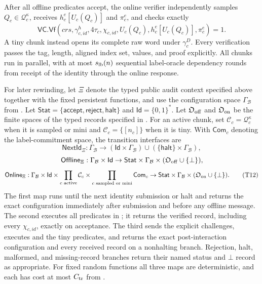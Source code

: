 \documentclass[11pt]{article}
\begin{document}
After all offline predicates accept, the online verifier independently samples
$Q_c\in\mathcal Q_c^\kappa$, receives $h^e_c[U_c(Q_c)]$ and $\pi^e_c$, and
checks exactly
\[
 \mathsf{VC.Vf}(\mathit{crs},\gamma^h_{c,\mathit{id}},4\tau_c,
 \chi_{c,\mathit{id}},U_c(Q_c),h^e_c[U_c(Q_c)],\pi^e_c)=1.
\tag{T11}\label{eq:online-opening}
\]
A tiny chunk instead opens its complete raw word under $\gamma^D_c$.  Every
verification passes the tag, length, aligned index set, values, and proof
explicitly.  All chunks run in parallel, with at most $s_{\rm lb}(n)$
sequential label-oracle dependency rounds from receipt of the identity through
the online response.

For later rewinding, let $\Xi$ denote the typed public audit context specified
above together with the fixed persistent functions, and use the configuration
space $\Gamma_{\mathcal B}$ from .  Let
$\mathsf{Stat}=\{\mathsf{accept},\mathsf{reject},\mathsf{halt}\}$ and
$\mathsf{Id}=\{0,1\}^{*}$.  Let $\mathfrak O_{\rm off}$ and
$\mathfrak O_{\rm on}$ be the finite spaces of the typed records specified in
.  For an active
chunk, set
$\mathcal C_c=\mathcal Q_c^\kappa$ when it is sampled or mini and
$\mathcal C_c=\{[n_c]\}$ when it is tiny.  With $\mathsf{Com}_c$ denoting the
label-commitment space, the transition interfaces are
\[
 \mathsf{NextId}_\Xi:\Gamma_{\mathcal B}\to
  (\mathsf{Id}\times\Gamma_{\mathcal B})
  \cup(\{\mathsf{halt}\}\times\Gamma_{\mathcal B}),
\]
\[
 \mathsf{Offline}_\Xi:\Gamma_{\mathcal B}\times\mathsf{Id}\to
  \mathsf{Stat}\times\Gamma_{\mathcal B}\times
  (\mathfrak O_{\rm off}\cup\{\bot\}),
\]
\[
 \mathsf{Online}_\Xi:\Gamma_{\mathcal B}\times\mathsf{Id}
 \times\prod_{c\text{ active}}\mathcal C_c
 \times\prod_{c\text{ sampled or mini}}\mathsf{Com}_c
 \to\mathsf{Stat}\times\Gamma_{\mathcal B}\times
 (\mathfrak O_{\rm on}\cup\{\bot\}).
\tag{T12}\label{eq:transition-signatures}
\]
The first map runs until the next identity submission or halt and returns the
exact configuration immediately after submission and before any offline
message.  The second executes all predicates in
; it returns the verified
record, including every $\chi_{c,\mathit{id}}$, exactly on acceptance.  The
third sends the explicit challenges, executes  and
the tiny predicates, and returns the exact post-interaction configuration and
every received record on a nonhalting branch.  Rejection, halt, malformed, and
missing-record branches return their named status and $\bot$ record as
appropriate.  For fixed random functions all three maps are deterministic,
and each has cost at most $C_{\rm tr}$ from .
\end{document}
